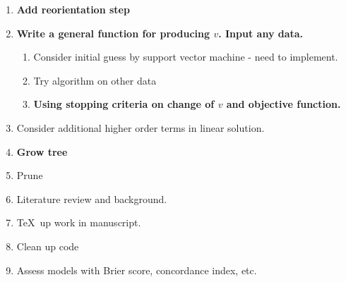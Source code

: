 \documentclass{article}
\begin{document}
\begin{enumerate}
\item \textbf{Add reorientation step}
\item \textbf{Write a general function for producing $v$. Input any data.}
\begin{enumerate}
\item Consider initial guess by support vector machine - need to implement. 
\item Try algorithm on other data
\item\textbf{ Using stopping criteria on change of $v$ and objective function.}
\end{enumerate}
\item Consider additional higher order terms in linear solution.
\item \textbf{Grow tree}
\item Prune
\item Literature review and background.
\item \TeX\ up work in manuscript.
\item Clean up code
\item Assess models with Brier score, concordance index, etc. 
\end{enumerate}
\end{document}
